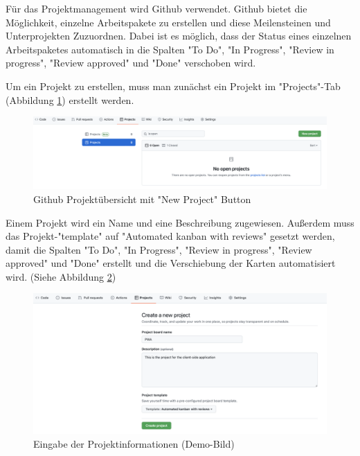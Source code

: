 
Für das Projektmanagement wird Github verwendet. Github bietet die Möglichkeit, einzelne Arbeitspakete zu erstellen und diese Meilensteinen und Unterprojekten Zuzuordnen. Dabei ist es möglich, dass der Status eines einzelnen Arbeitspaketes automatisch in die Spalten "To Do", "In Progress", "Review in progress", "Review approved" und "Done" verschoben wird.


Um ein Projekt zu erstellen, muss man zunächst ein Projekt im "Projects"-Tab (Abbildung \ref{fig:newProject}) erstellt werden.

\begin{figure}[H]
    \centering
    \includegraphics[width=\textwidth]{media/ProjectManagement/CreateProject.png}
    \caption{Github Projektübersicht mit "New Project" Button}
    \label{fig:newProject}
\end{figure}

Einem Projekt wird ein Name und eine Beschreibung zugewiesen. Außerdem muss das Projekt-"template" auf "Automated kanban with reviews" gesetzt werden, damit die Spalten "To Do", "In Progress", "Review in progress", "Review approved" und "Done" erstellt und die Verschiebung der Karten automatisiert wird. (Siehe Abbildung \ref{fig:enterProjectInfo})

\begin{figure}[H]
    \centering
    \includegraphics[width=\textwidth]{media/ProjectManagement/EnterProjectInfo.png}
    \caption{Eingabe der Projektinformationen (Demo-Bild)}
    \label{fig:enterProjectInfo}
\end{figure}

